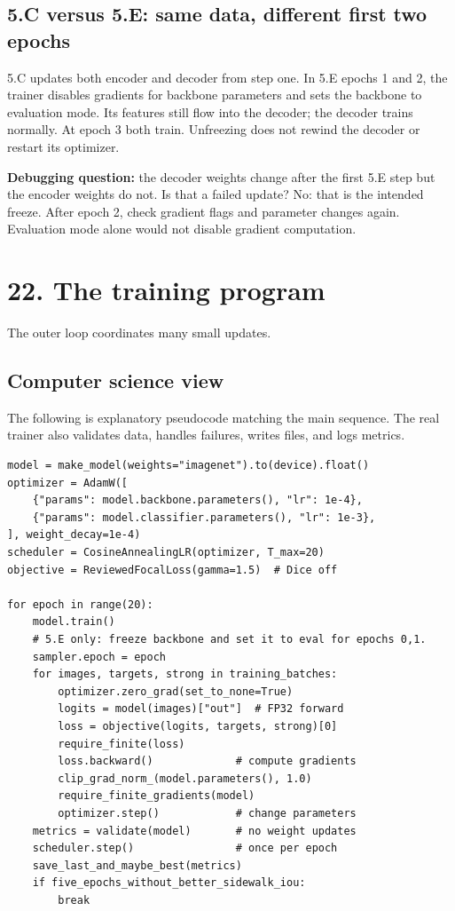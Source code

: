 \documentclass[11pt,letterpaper]{article}
\newcommand{\guidepage}[2]{\clearpage\pdfbookmark[0]{#1}{guide-\thepage}\section*{#1}{\sffamily\color{muted}#2}\par\vspace{5pt}}
\begin{document}
\subsection*{5.C versus 5.E: same data, different first two epochs}
5.C updates both encoder and decoder from step one. In 5.E epochs 1 and 2, the trainer disables gradients for backbone parameters and sets the backbone to evaluation mode. Its features still flow into the decoder; the decoder trains normally. At epoch 3 both train. Unfreezing does not rewind the decoder or restart its optimizer.

\textbf{Debugging question:} the decoder weights change after the first 5.E step but the encoder weights do not. Is that a failed update? No: that is the intended freeze. After epoch 2, check gradient flags and parameter changes again. Evaluation mode alone would not disable gradient computation.

\guidepage{22. The training program}{The outer loop coordinates many small updates.}
\subsection*{Computer science view}
The following is explanatory pseudocode matching the main sequence. The real trainer also validates data, handles failures, writes files, and logs metrics.
\begin{lstlisting}
model = make_model(weights="imagenet").to(device).float()
optimizer = AdamW([
    {"params": model.backbone.parameters(), "lr": 1e-4},
    {"params": model.classifier.parameters(), "lr": 1e-3},
], weight_decay=1e-4)
scheduler = CosineAnnealingLR(optimizer, T_max=20)
objective = ReviewedFocalLoss(gamma=1.5)  # Dice off

for epoch in range(20):
    model.train()
    # 5.E only: freeze backbone and set it to eval for epochs 0,1.
    sampler.epoch = epoch
    for images, targets, strong in training_batches:
        optimizer.zero_grad(set_to_none=True)
        logits = model(images)["out"]  # FP32 forward
        loss = objective(logits, targets, strong)[0]
        require_finite(loss)
        loss.backward()             # compute gradients
        clip_grad_norm_(model.parameters(), 1.0)
        require_finite_gradients(model)
        optimizer.step()            # change parameters
    metrics = validate(model)       # no weight updates
    scheduler.step()                # once per epoch
    save_last_and_maybe_best(metrics)
    if five_epochs_without_better_sidewalk_iou:
        break
\end{lstlisting}
\end{document}
